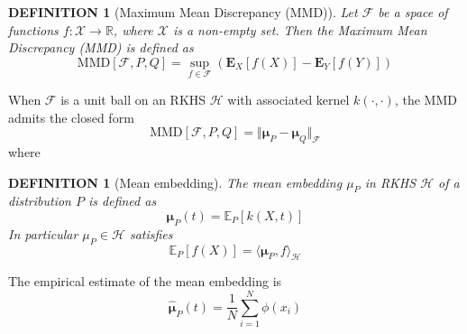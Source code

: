 \documentclass[a4paper,12pt]{article}
\newtheorem{definition}[theorem]{DEFINITION}
\newcommand{\E}{\mathbb{E}}
\begin{document}
\begin{definition}[Maximum Mean Discrepancy (MMD)]
Let $\mathcal{F}$ be a space of functions $f:\mathcal{X}\rightarrow \mathbb{R}$, where $\mathcal{X}$ is a non-empty set. Then the Maximum Mean Discrepancy (MMD) is defined as
    \begin{equation}
        \mathrm{MMD}[\mathcal{F}, P, Q]=\sup _{f \in \mathcal{F}}\left(\mathbf{E}_{X}[f(X)]-\mathbf{E}_{Y}[f(Y)]\right)
    \label{eq:mmd}
    \end{equation}
\end{definition}
When $\mathcal{F}$ is a unit ball on an RKHS $\mathcal{H}$ with associated kernel $k(\cdot, \cdot)$, the MMD admits the closed form
\begin{equation}
        \mathrm{MMD}[\mathcal{F}, P, Q] = \Vert \mathbf{\mu}_{P}-\mathbf{\mu}_{Q} \Vert_{\mathcal{F}}
    \label{eq:mmd_closed}
\end{equation}
where
\begin{definition}[Mean embedding]
The mean embedding $\mu_{P}$ in RKHS $\mathcal{H}$ of a distribution $P$ is defined as 
    \begin{equation}
        \mathbf{\mu}_{P}(t) = \E_{P}[k(X, t)]
    \end{equation}    
    In particular $\mu_{P} \in \mathcal{H}$ satisfies
    \begin{equation}
        \E_{P}[f(X)] = \langle \mathbf{\mu}_{P}, f \rangle_{\mathcal{H}}
    \end{equation}
\end{definition}
The empirical estimate of the mean embedding is 
\begin{equation}
    \hat{\mathbf{\mu}}_{P}(t) = \frac{1}{N}\sum_{i=1}^{N}\phi(x_{i})
\end{equation}
\end{document}
